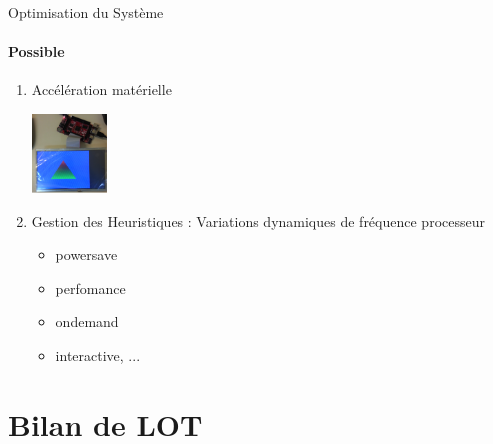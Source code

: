 \documentclass[11pt]{beamer}
\begin{document}
	
	\begin{frame}{Optimisation du Système}
	\framesubtitle{Possible}
	 \begin{enumerate}
	 \pause
	 \item Accélération matérielle 
	\begin{center}
		\includegraphics[width=2cm]{common/opengles.png}
	\end{center}
	\pause
	 \item Gestion des Heuristiques : Variations dynamiques de fréquence processeur
	 \pause
	
	 \begin{itemize}
	 \item powersave
	 \pause
	 \item perfomance
	 \pause
	 \item ondemand
	 \pause
	 \item interactive, ...
	 
	 
	\end{itemize}
	 \end{enumerate}
	\end{frame}

	
	\section{Bilan de LOT}
\end{document}
